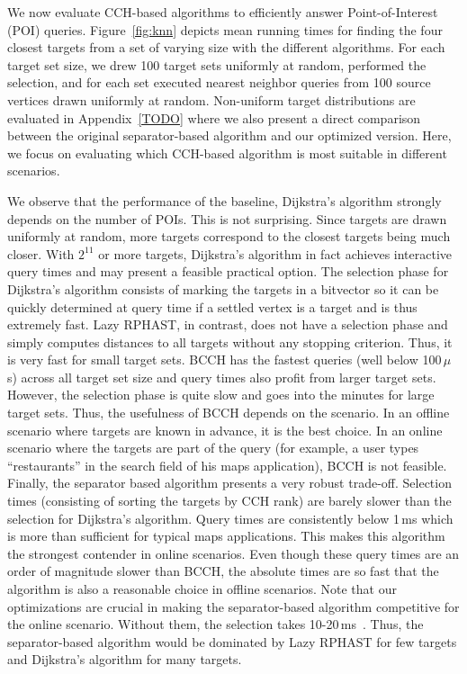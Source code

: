 \documentclass[a4paper, english, cleveref]{lipics-v2021}
\begin{document}
We now evaluate CCH-based algorithms to efficiently answer Point-of-Interest (POI) queries.
Figure~\ref{fig:knn} depicts mean running times for finding the four closest targets from a set of varying size with the different algorithms.
For each target set size, we drew 100 target sets uniformly at random, performed the selection, and for each set executed nearest neighbor queries from 100 source vertices drawn uniformly at random.
Non-uniform target distributions are evaluated in Appendix~\ref{TODO} where we also present a direct comparison between the original separator-based algorithm and our optimized version.
Here, we focus on evaluating which CCH-based algorithm is most suitable in different scenarios.

We observe that the performance of the baseline, Dijkstra's algorithm strongly depends on the number of POIs.
This is not surprising.
Since targets are drawn uniformly at random, more targets correspond to the closest targets being much closer.
With $2^{11}$ or more targets, Dijkstra's algorithm in fact achieves interactive query times and may present a feasible practical option.
The selection phase for Dijkstra's algorithm consists of marking the targets in a bitvector so it can be quickly determined at query time if a settled vertex is a target and is thus extremely fast.
Lazy RPHAST, in contrast, does not have a selection phase and simply computes distances to all targets without any stopping criterion.
Thus, it is very fast for small target sets.
BCCH has the fastest queries (well below 100\,$\mu$s) across all target set size and query times also profit from larger target sets.
However, the selection phase is quite slow and goes into the minutes for large target sets.
Thus, the usefulness of BCCH depends on the scenario.
In an offline scenario where targets are known in advance, it is the best choice.
In an online scenario where the targets are part of the query (for example, a user types ``restaurants'' in the search field of his maps application), BCCH is not feasible.
Finally, the separator based algorithm presents a very robust trade-off.
Selection times (consisting of sorting the targets by CCH rank) are barely slower than the selection for Dijkstra's algorithm.
Query times are consistently below 1\,ms which is more than sufficient for typical maps applications.
This makes this algorithm the strongest contender in online scenarios.
Even though these query times are an order of magnitude slower than BCCH, the absolute times are so fast that the algorithm is also a reasonable choice in offline scenarios.
Note that our optimizations are crucial in making the separator-based algorithm competitive for the online scenario.
Without them, the selection takes 10-20\,ms~\cite{TODO}.
Thus, the separator-based algorithm would be dominated by Lazy RPHAST for few targets and Dijkstra's algorithm for many targets.
\end{document}
